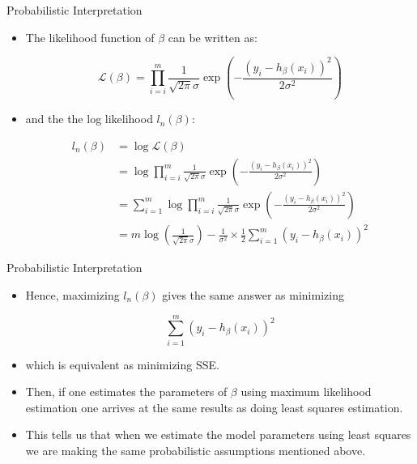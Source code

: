 \documentclass[handout]{beamer}
\begin{document}
\begin{frame}{Probabilistic Interpretation}
\scriptsize{
\begin{itemize}



 \item The likelihood function of $\beta$ can be written as:
 
 \begin{displaymath}
  \mathcal{L}(\beta) = \prod_{i=i}^{m}\frac{1}{\sqrt{2\pi} \sigma} \exp \left(- \frac{(y_i - h_{\beta}(x_{i}) )^{2}}{2\sigma^2}\right)
 \end{displaymath}

 \item and the the log likelihood $l_n(\beta)$:
 
   \begin{align}
l_n(\beta)  & =  \log  \mathcal{L}(\beta) \\
 & = \log \prod_{i=i}^{m}\frac{1}{\sqrt{2\pi} \sigma} \exp \left(- \frac{(y_i - h_{\beta}(x_{i}) )^{2}}{2\sigma^2}\right) \\
  & = \sum_{i=1}^m  \log \prod_{i=i}^{m}\frac{1}{\sqrt{2\pi} \sigma} \exp \left(- \frac{(y_i - h_{\beta}(x_{i}) )^{2}}{2\sigma^2}\right) \\
    & = m \log\left(\frac{1}{\sqrt{2\pi} \sigma}\right) - \frac{1}{\sigma^2}\times \frac{1}{2}\sum_{i=1}^m(y_i - h_{\beta}(x_{i}) )^{2}  
 \end{align}
 

\end{itemize}


}
 
\end{frame}


\begin{frame}{Probabilistic Interpretation}
\scriptsize{
\begin{itemize}



 \item Hence, maximizing $l_n(\beta)$ gives the same answer as minimizing
 
 \begin{displaymath}
\sum_{i=1}^m(y_i - h_{\beta}(x_{i}))^{2}
 \end{displaymath}

 \item which is equivalent as minimizing SSE.
 
 \item  Then, if one estimates the parameters of $\beta$ using maximum likelihood estimation one arrives at the same results as doing least squares estimation.
 \item This tells us that when we estimate the model parameters using least squares we are making the same probabilistic assumptions mentioned above.

\end{itemize}


}
 
\end{frame}
\end{document}
